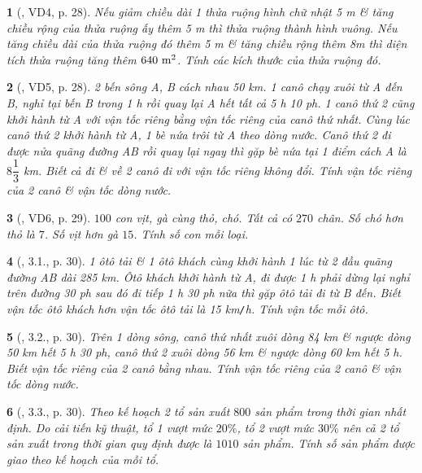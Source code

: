 \documentclass{article}
\newtheorem{baitoan}{}
\begin{document}
\begin{baitoan}[\cite{Binh_boi_duong_Toan_9_tap_2}, VD4, p. 28]
	Nếu giảm chiều dài 1 thửa ruộng hình chữ nhật {\rm5 m} \& tăng chiều rộng của thửa ruộng ấy thêm {\rm5 m} thì thửa ruộng thành hình vuông. Nếu tăng chiều dài của thửa ruộng đó thêm {\rm5 m} \& tăng chiều rộng thêm {\rm 8m} thì diện tích thửa ruộng tăng thêm $\rm640\ m^2$. Tính các kích thước của thửa ruộng đó.
\end{baitoan}

\begin{baitoan}[\cite{Binh_boi_duong_Toan_9_tap_2}, VD5, p. 28]
	2 bến sông A, B cách nhau {\rm50 km}. 1 canô chạy xuôi từ A đến B, nghỉ tại bến B trong {\rm1 h} rồi quay lại A hết tất cả {\rm5 h 10 ph}. 1 canô thứ 2 cũng khởi hành từ A với vận tốc riêng bằng vận tốc riêng của canô thứ nhất. Cùng lúc canô thứ 2 khởi hành từ A, 1 bè nứa trôi từ A theo dòng nước. Canô thứ 2 đi được nửa quãng đường AB rồi quay lại ngay thì gặp bè nứa tại 1 điểm cách A là $8\dfrac{1}{3}$ {\rm km}. Biết cả đi \& về 2 canô đi với vận tốc riêng không đổi. Tính vận tốc riêng của 2 canô \& vận tốc dòng nước.
\end{baitoan}

\begin{baitoan}[\cite{Binh_boi_duong_Toan_9_tap_2}, VD6, p. 29]
	$100$ con vịt, gà cùng thỏ, chó. Tất cả có $270$ chân. Số chó hơn thỏ là $7$. Số vịt hơn gà $15$. Tính số con mỗi loại.
\end{baitoan}

\begin{baitoan}[\cite{Binh_boi_duong_Toan_9_tap_2}, 3.1., p. 30]
	1 ôtô tải \& 1 ôtô khách cùng khởi hành 1 lúc từ 2 đầu quãng đường AB dài {\rm285 km}. Ôtô khách khởi hành từ A, đi được {\rm1 h} phải dừng lại nghỉ trên đường {\rm30 ph} sau đó đi tiếp {\rm1 h 30 ph} nữa thì gặp ôtô tải đi từ B đến. Biết vận tốc ôtô khách hơn vận tốc ôtô tải là {\rm15 km{\tt/}h}. Tính vận tốc mỗi ôtô.
\end{baitoan}

\begin{baitoan}[\cite{Binh_boi_duong_Toan_9_tap_2}, 3.2., p. 30]
	Trên 1 dòng sông, canô thứ nhất xuôi dòng {\rm84 km} \& ngược dòng {\rm50 km} hết {\rm5 h 30 ph}, canô thứ 2 xuôi dòng {\rm56 km} \& ngược dòng {\rm60 km} hết {\rm5 h}. Biết vận tốc riêng của 2 canô bằng nhau. Tính vận tốc riêng của 2 canô \& vận tốc dòng nước.
\end{baitoan}

\begin{baitoan}[\cite{Binh_boi_duong_Toan_9_tap_2}, 3.3., p. 30]
	Theo kế hoạch 2 tổ sản xuất $800$ sản phẩm trong thời gian nhất định. Do cải tiến kỹ thuật, tổ 1 vượt mức $20\%$, tổ 2 vượt mức $30\%$ nên cả 2 tổ sản xuất trong thời gian quy định được là $1010$ sản phẩm. Tính số sản phẩm được giao theo kế hoạch của mỗi tổ.
\end{baitoan}
\end{document}
